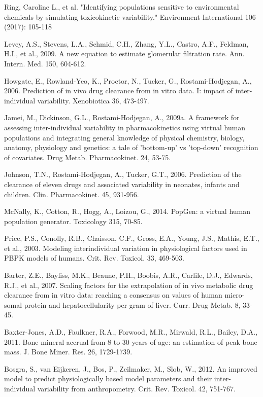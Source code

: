 \documentclass[a4paper]{book}
\begin{document}
\begin{References}\relax
Ring, Caroline L., et al. "Identifying populations sensitive to 
environmental chemicals by simulating toxicokinetic variability." Environment 
International 106 (2017): 105-118     

Levey, A.S., Stevens, L.A., Schmid, C.H., Zhang, Y.L., Castro, A.F., Feldman, H.I., et al.,
2009. A new equation to estimate glomerular filtration rate. Ann. Intern. Med. 150,
604-612.

Howgate, E., Rowland-Yeo, K., Proctor, N., Tucker, G., Rostami-Hodjegan, A., 2006.
Prediction of in vivo drug clearance from in vitro data. I: impact of inter-individual
variability. Xenobiotica 36, 473-497.

Jamei, M., Dickinson, G.L., Rostami-Hodjegan, A., 2009a. A framework for assessing
inter-individual variability in pharmacokinetics using virtual human populations and
integrating general knowledge of physical chemistry, biology, anatomy, physiology
and genetics: a tale of 'bottom-up' vs 'top-down' recognition of covariates. Drug Metab.
Pharmacokinet. 24, 53-75.

Johnson, T.N., Rostami-Hodjegan, A., Tucker, G.T., 2006. Prediction of the clearance of
eleven drugs and associated variability in neonates, infants and children. Clin.
Pharmacokinet. 45, 931-956.

McNally, K., Cotton, R., Hogg, A., Loizou, G., 2014. PopGen: a virtual human population
generator. Toxicology 315, 70-85.

Price, P.S., Conolly, R.B., Chaisson, C.F., Gross, E.A., Young, J.S., Mathis, E.T., et al.,
2003. Modeling interindividual variation in physiological factors used in PBPK
models of humans. Crit. Rev. Toxicol. 33, 469-503.

Barter, Z.E., Bayliss, M.K., Beaune, P.H., Boobis, A.R., Carlile, D.J., Edwards, R.J., et al.,
2007. Scaling factors for the extrapolation of in vivo metabolic drug clearance from
in vitro data: reaching a consensus on values of human micro-somal protein and
hepatocellularity per gram of liver. Curr. Drug Metab. 8, 33-45.

Baxter-Jones, A.D., Faulkner, R.A., Forwood, M.R., Mirwald, R.L., Bailey, D.A., 2011.
Bone mineral accrual from 8 to 30 years of age: an estimation of peak bone mass. J.
Bone Miner. Res. 26, 1729-1739.

Bosgra, S., van Eijkeren, J., Bos, P., Zeilmaker, M., Slob, W., 2012. An improved model to
predict physiologically based model parameters and their inter-individual variability
from anthropometry. Crit. Rev. Toxicol. 42, 751-767.


\end{References}
\end{document}
